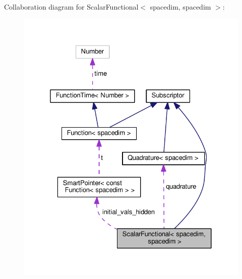 Collaboration diagram for Scalar\+Functional$<$ spacedim, spacedim $>$\+:\nopagebreak
\begin{figure}[H]
\begin{center}
\leavevmode
\includegraphics[width=325pt]{class_scalar_functional_3_01spacedim_00_01spacedim_01_4__coll__graph}
\end{center}
\end{figure}
